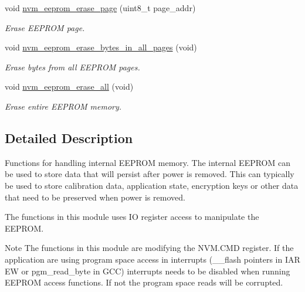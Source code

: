 \begin{DoxyCompactItemize}
void \hyperlink{group__nvm__eeprom__group_ga75f4e0c9419252c81387e79356433bca}{nvm\-\_\-eeprom\-\_\-erase\-\_\-page} (uint8\-\_\-t page\-\_\-addr)
\begin{DoxyCompactList}\small\item\em Erase E\-E\-P\-R\-O\-M page. \end{DoxyCompactList}\item 
void \hyperlink{group__nvm__eeprom__group_ga0d4308eb16bb32a0a522744a28f5969e}{nvm\-\_\-eeprom\-\_\-erase\-\_\-bytes\-\_\-in\-\_\-all\-\_\-pages} (void)
\begin{DoxyCompactList}\small\item\em Erase bytes from all E\-E\-P\-R\-O\-M pages. \end{DoxyCompactList}\item 
void \hyperlink{group__nvm__eeprom__group_gac87e872a5b79f534b409735066514274}{nvm\-\_\-eeprom\-\_\-erase\-\_\-all} (void)
\begin{DoxyCompactList}\small\item\em Erase entire E\-E\-P\-R\-O\-M memory. \end{DoxyCompactList}\end{DoxyCompactItemize}


\subsection{Detailed Description}
Functions for handling internal E\-E\-P\-R\-O\-M memory. The internal E\-E\-P\-R\-O\-M can be used to store data that will persist after power is removed. This can typically be used to store calibration data, application state, encryption keys or other data that need to be preserved when power is removed.

The functions in this module uses I\-O register access to manipulate the E\-E\-P\-R\-O\-M.

\begin{DoxyNote}{Note}
The functions in this module are modifying the N\-V\-M.\-C\-M\-D register. If the application are using program space access in interrupts (\-\_\-\-\_\-flash pointers in I\-A\-R E\-W or pgm\-\_\-read\-\_\-byte in G\-C\-C) interrupts needs to be disabled when running E\-E\-P\-R\-O\-M access functions. If not the program space reads will be corrupted. 
\end{DoxyNote}


